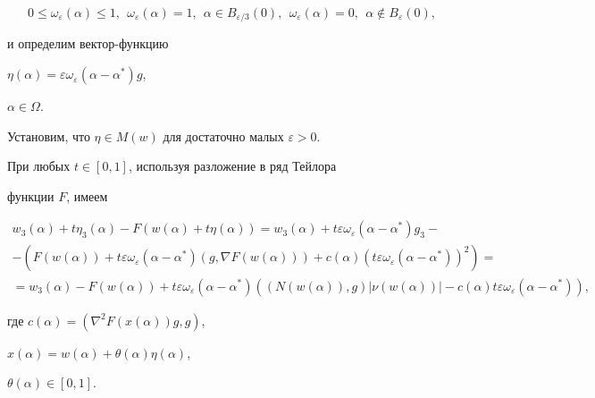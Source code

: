 $$


0 \leq \omega _{\varepsilon} (\alpha ) \leq 1,


\ \ \omega _{\varepsilon} (\alpha )=1, 


\ \ \alpha \in B_{\varepsilon / 3}(0),


\ \ \omega _{\varepsilon} (\alpha )=0, 


\ \ \alpha \notin B_{\varepsilon}(0),


$$


и определим вектор-функцию 


$\eta (\alpha )=\varepsilon \omega _{\varepsilon} (\alpha -\alpha ^*) g$, 


$\alpha \in \Omega $.


Установим, что $\eta \in M(w)$ для достаточно малых $\varepsilon > 0$. 


При любых $t \in [0, 1]$, используя разложение в ряд Тейлора


функции $F$, имеем


\begin{multline}


w_3 (\alpha )+t \eta_3(\alpha ) - F(w (\alpha )+t \eta(\alpha ))=


w_3 (\alpha )+t \varepsilon \omega _{\varepsilon}(\alpha -\alpha ^*) g_3 - \\


%


-(F(w (\alpha ))+t \varepsilon \omega _{\varepsilon} (\alpha -\alpha ^*) 


( g, \nabla F(w( \alpha )))+


c(\alpha ) ( t \varepsilon \omega _{\varepsilon} (\alpha -\alpha ^*) )^2)=\\


%


=w_3 (\alpha ) - F(w (\alpha ))+


t \varepsilon \omega _{\varepsilon} (\alpha -\alpha ^*)


( ( N(w (\alpha )), g ) |\nu (w(\alpha ))|


- c(\alpha ) t \varepsilon 


\omega _{\varepsilon} (\alpha -\alpha ^*)),


\label{bzb14}


\end{multline}


где $c(\alpha )=(\nabla^2 F(x(\alpha )) g, g )$,


$x(\alpha)=w (\alpha )+\theta (\alpha ) \eta (\alpha )$,


$\theta (\alpha ) \in [0,1]$.


